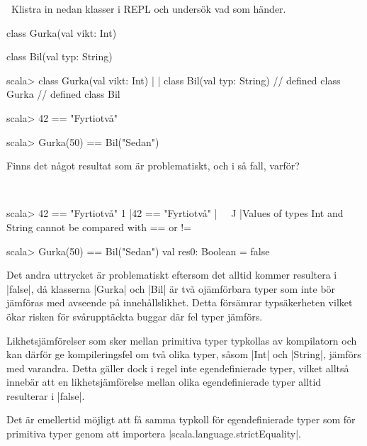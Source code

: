 \QUESTEND






\clearpage

\AdvancedTasks %


\QUESTBEGIN

\Task \what~Klistra in nedan klasser i REPL och undersök vad som händer.

\begin{Code}
class Gurka(val vikt: Int)

class Bil(val typ: String)
\end{Code}

\begin{REPL}
scala> class Gurka(val vikt: Int)
     |
     | class Bil(val typ: String)
// defined class Gurka
// defined class Bil

scala> 42 == "Fyrtiotvå"

scala> Gurka(50) == Bil("Sedan")

\end{REPL}

Finns det något resultat som är problematiskt, och i så fall, varför?


\SOLUTION

\TaskSolved \what~
\begin{REPL}
scala> 42 == "Fyrtiotvå"
1 |42 == "Fyrtiotvå"
  |^^^^^^^^^^^^^^^^^
  |Values of types Int and String cannot be compared with == or !=

scala> Gurka(50) == Bil("Sedan")
val res0: Boolean = false
\end{REPL}

Det andra uttrycket är problematiskt eftersom det alltid kommer resultera i \code|false|, då klasserna \code|Gurka| och \code|Bil| är två ojämförbara typer som inte bör jämföras med avseende på innehållslikhet. Detta försämrar typsäkerheten vilket ökar risken för svårupptäckta buggar där fel typer jämförs.

Likhetsjämförelser som sker mellan primitiva typer typkollas av kompilatorn och kan därför ge kompileringsfel om två olika typer, såsom \code|Int| och \code|String|, jämförs med varandra. Detta gäller dock i regel inte egendefinierade typer, vilket alltså innebär att en likhetsjämförelse mellan olika egendefinierade typer alltid resulterar i \code|false|.

Det är emellertid möjligt att få samma typkoll för egendefinierade typer som för primitiva typer genom att importera \code|scala.language.strictEquality|.

